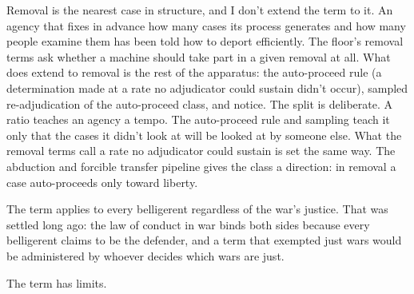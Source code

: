 Removal is the nearest case in structure, and I don't extend the term to it. An agency that fixes in advance how many cases its process generates and how many people examine them has been told how to deport efficiently. The floor's removal terms ask whether a machine should take part in a given removal at all. What does extend to removal is the rest of the apparatus: the auto-proceed rule (a determination made at a rate no adjudicator could sustain didn't occur), sampled re-adjudication of the auto-proceed class, and notice. The split is deliberate. A ratio teaches an agency a tempo. The auto-proceed rule and sampling teach it only that the cases it didn't look at will be looked at by someone else. What the removal terms call a rate no adjudicator could sustain is set the same way. The abduction and forcible transfer pipeline gives the class a direction: in removal a case auto-proceeds only toward liberty.

The term applies to every belligerent regardless of the war's justice. That was settled long ago: the law of conduct in war binds both sides because every belligerent claims to be the defender, and a term that exempted just wars would be administered by whoever decides which wars are just.

The term has limits.

